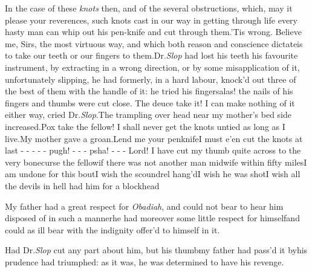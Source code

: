 \documentclass{article}
\begin{document}
In the case of these \textit{knots} then, and of the several obstructions, which,
may it please your reverences, such knots cast in our way in getting through life\tsh
every hasty man can whip out his pen-knife and cut through them.\tsh ’Tis wrong.
Believe me, Sirs, the most virtuous way, and which both reason and conscience
dictate\tsk is to take our teeth or our fingers to them.\tsh Dr.\@ \textit{Slop} had lost his teeth\tsk
his favourite instrument, by extracting in a wrong direction, or by some
misapplication of it, unfortunately slipping, he had formerly, in a hard labour,
knock’d out three of the best of them with the handle of it:\tsh\break
he tried his fingers\tsk alas! the nails of his fingers and thumbs were cut
close.\tsk\break
The deuce take it! I
can make nothing of it either way, cried Dr.\@ \textit{Slop}.\tsh The trampling over head near my
mother’s bed side increased.\tsk Pox take the fellow! I shall never get the knots
untied as long as I live.\tsh My mother gave a groan.\tsk Lend me your penknife\tsk I
must e’en cut the knots at last - - - - - pugh! - - - psha!\break
- - - Lord!  I have cut my thumb quite
across to the very bone\tsh curse the fellow\tsk if there was not another man midwife
within fifty miles\tsk I am undone\break
for this bout\tsk I wish the scoundrel\break
hang’d\tsh I wish he was shot\tsh I wish 
all the devils in hell had him for a blockhead\tsh

My father had a great respect for \textit{Obadiah}, and could not
bear to hear him disposed of in such a manner\tsh he had moreover
some little respect for himself\tsh and could as ill bear with the indignity
offer’d to himself in it.

Had Dr.\@ \textit{Slop} cut any part about him, but his
thumb\tsh my father had pass’d it by\tsh his
prudence had triumphed: as it was, he was determined to have his
revenge.
\end{document}

